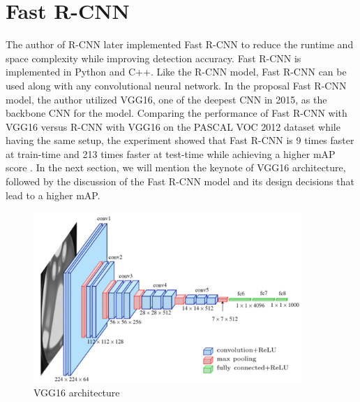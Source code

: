 \section{Fast R-CNN} \label{sec:fast_rcnn}

The author of R-CNN later implemented Fast R-CNN to reduce the runtime and space complexity while improving detection accuracy. Fast R-CNN is implemented in Python and C++. Like the R-CNN model, Fast R-CNN can be used along with any convolutional neural network. In the proposal Fast R-CNN model, the author utilized VGG16, one of the deepest CNN in 2015, as the backbone CNN for the model. Comparing the performance of Fast R-CNN with VGG16 versus R-CNN with VGG16 on the PASCAL VOC 2012 dataset while having the same setup, the experiment showed that Fast R-CNN is 9 times faster at train-time and 213 times faster at test-time while achieving a higher mAP score \cite{fast_rcnn_og}. In the next section, we will mention the keynote of VGG16 architecture, followed by the discussion of the Fast R-CNN model and its design decisions that lead to a higher mAP.

\begin{figure}[!ht]
    \centering
    \includegraphics[width=4in]{figures/vgg16_architect.png}
    \caption{VGG16 architecture \cite{vgg16_architect_2014}}
    \label{fig:vgg16_archite}
\end{figure}

